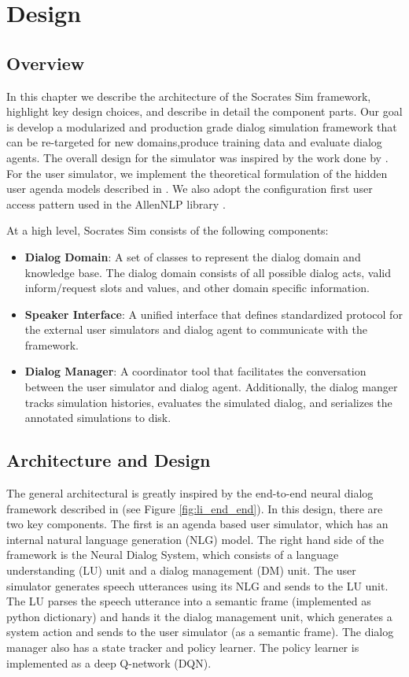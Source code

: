 \chapter{Design}
\label{chap:design}

\section{Overview}
\label{sec:designintroduction}

In this chapter we describe the architecture of the Socrates Sim framework, highlight key design choices, and describe in detail the component parts. Our goal is develop a modularized and production grade dialog simulation framework that can be re-targeted for new domains,produce training data and evaluate dialog agents. The overall design for the simulator was inspired by the work done by \cite{li_usersim}. For the user simulator, we implement the theoretical formulation of the hidden user agenda models described in \cite{Schatzmann2009TheHA}. We also adopt the configuration first user access pattern used in the AllenNLP library \cite{Gardner_allennlp}.

At a high level, Socrates Sim consists of the following components:
\begin{itemize}
	\item \textbf{Dialog Domain}: A set of classes to represent the dialog domain and knowledge base. The dialog domain consists of all possible dialog acts, valid inform/request slots and values, and other domain specific information. 
	\item \textbf{Speaker Interface}: A unified interface that defines standardized protocol for the external user simulators and dialog agent to communicate with the framework. 
	\item \textbf{Dialog Manager}: A coordinator tool that facilitates the conversation between the user simulator and dialog agent. Additionally, the dialog manger tracks simulation histories, evaluates the simulated dialog, and serializes the annotated simulations to disk.  
\end{itemize}


\section{Architecture and Design} 

The general architectural is greatly inspired by the end-to-end neural dialog framework described in \cite{li_end_to_end}  (see Figure \ref{fig:li_end_end}). In this design, there are two key components. The first is an agenda based user simulator, which has an internal natural language generation (NLG) model. The right hand side of the framework is the Neural Dialog System, which consists of a language understanding (LU) unit and a dialog management (DM) unit. The user simulator generates speech utterances using its NLG and sends to the LU unit. The LU parses the speech utterance into a semantic frame (implemented as python dictionary) and hands it the dialog management unit, which generates a system action and sends to the user simulator (as a semantic frame). The dialog manager also has a state tracker and policy learner. The policy learner is implemented as a deep Q-network (DQN). 

